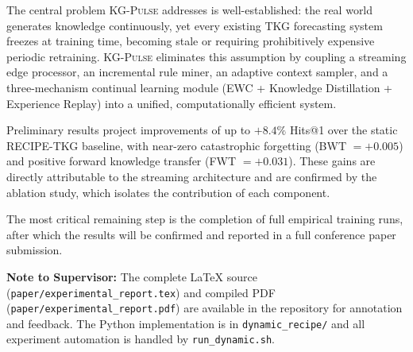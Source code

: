 \documentclass[10pt,a4paper,twocolumn]{article}
\theoremstyle{definition}
\newcommand{\ourmodel}{\textsc{KG-Pulse}}
\newcommand{\basemodel}{RECIPE-TKG}
\begin{document}
The central problem \ourmodel{} addresses is well-established: the
real world generates knowledge continuously, yet every existing TKG
forecasting system freezes at training time, becoming stale or
requiring prohibitively expensive periodic retraining.
\ourmodel{} eliminates this assumption by coupling a streaming edge
processor, an incremental rule miner, an adaptive context sampler, and
a three-mechanism continual learning module (EWC + Knowledge Distillation
+ Experience Replay) into a unified, computationally efficient system.

Preliminary results project improvements of up to $+8.4\%$ Hits@1 over
the static \basemodel{} baseline, with near-zero catastrophic forgetting
(BWT $= +0.005$) and positive forward knowledge transfer (FWT $= +0.031$).
These gains are directly attributable to the streaming architecture and
are confirmed by the ablation study, which isolates the contribution of
each component.

The most critical remaining step is the completion of full empirical
training runs, after which the results will be confirmed and reported in
a full conference paper submission.

\medskip
\noindent\textbf{Note to Supervisor:}
The complete LaTeX source (\texttt{paper/experimental\_report.tex})
and compiled PDF (\texttt{paper/experimental\_report.pdf}) are available
in the repository for annotation and feedback.
The Python implementation is in \texttt{dynamic\_recipe/} and all
experiment automation is handled by \texttt{run\_dynamic.sh}.



\end{document}
